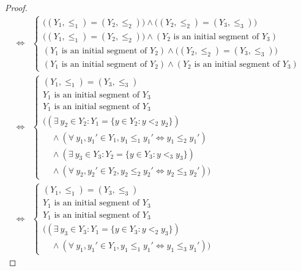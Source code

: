 \begin{proof}
\begin{align*}
        \iff & \begin{cases}
            \big((Y_1, \leq_1) = (Y_2, \leq_2)\big) \land \big((Y_2, \leq_2) = (Y_3, \leq_3)\big)     \\
            \big((Y_1, \leq_1) = (Y_2, \leq_2)\big) \land (Y_2 \text{ is an initial segment of } Y_3) \\
            (Y_1 \text{ is an initial segment of } Y_2) \land \big((Y_2, \leq_2) = (Y_3, \leq_3)\big) \\
            (Y_1 \text{ is an initial segment of } Y_2) \land (Y_2 \text{ is an initial segment of } Y_3)
        \end{cases}                                                                                                                                         \\
        \iff & \begin{cases}
            (Y_1, \leq_1) = (Y_3, \leq_3)                                                  \\
            Y_1 \text{ is an initial segment of } Y_3                                      \\
            Y_1 \text{ is an initial segment of } Y_3                                      \\
            \big((\exists\ y_2 \in Y_2 : Y_1 = \{y \in Y_2 : y <_2 y_2\})                  \\
            \quad \land (\forall\ y_1, y_1' \in Y_1, y_1 \leq_1 y_1' \iff y_1 \leq_2 y_1') \\
            \quad \land (\exists\ y_3 \in Y_3 : Y_2 = \{y \in Y_3 : y <_3 y_3\})           \\
            \quad \land (\forall\ y_2, y_2' \in Y_2, y_2 \leq_2 y_2' \iff y_2 \leq_3 y_2')\big)
        \end{cases}                                                                                                                                         \\
        \iff & \begin{cases}
            (Y_1, \leq_1) = (Y_3, \leq_3)                                 \\
            Y_1 \text{ is an initial segment of } Y_3                     \\
            Y_1 \text{ is an initial segment of } Y_3                     \\
            \big((\exists\ y_3 \in Y_3 : Y_1 = \{y \in Y_3 : y <_2 y_3\}) \\
            \quad \land (\forall\ y_1, y_1' \in Y_1, y_1 \leq_1 y_1' \iff y_1 \leq_3 y_1')\big)

\end{cases}
\end{align*}
\end{proof}
